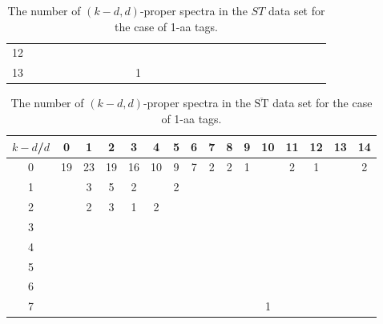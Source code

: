 \documentclass{article}[12pt]
\def\STbar{{\overline{\mathrm{ST}}}}
\begin{document}
\begin{landscape}
\begin{table}[h]
{\begin{tabular}{|c|c|
c|c|c|c|c|c|c|c|c|c|c|c|c|c|c|c|c|c|c|c|c|c|c|c|c|}
12  &  &  &  &  &  &  &  &  &  &  &  &  &  &  &  &  &  &  &  &  &  &  &  &  &  & \\

13  &  &  &  &  &  &  &  &  &  & 1 &  &  &  &  &  &  &  &  &  &  &  &  &  &  &  & \\

  \hline
\end{tabular}
\par}
\centering
\caption{The number of $(k-d,d)$-proper spectra in the $ST$ data set for the case of 1-aa tags.}
\vspace{3mm}
\label{table:kd-1-proper-ST}
\end{table}
\end{landscape}
\begin{landscape}

\begin{table}[h]\footnotesize
{\centering
\begin{tabular}{|c|c|
c|c|c|c|c|c|c|c|c|c|c|c|c|c|}
  \hline
  $k-d$/$d$ 
 & 0 & 1 & 2 & 3 & 4 & 5 & 6 & 7 & 8 & 9 & 10 & 11 & 12 & 13 & 14\\

  \hline
  \hline

0  & 19 & 23 & 19 & 16 & 10 & 9 & 7 & 2 & 2 & 1 &  & 2 & 1 &  & 2\\

1  &  & 3 & 5 & 2 &  & 2 &  &  &  &  &  &  &  &  & \\

2  &  & 2 & 3 & 1 & 2 &  &  &  &  &  &  &  &  &  & \\

3  &  &  &  &  &  &  &  &  &  &  &  &  &  &  & \\

4  &  &  &  &  &  &  &  &  &  &  &  &  &  &  & \\

5  &  &  &  &  &  &  &  &  &  &  &  &  &  &  & \\

6  &  &  &  &  &  &  &  &  &  &  &  &  &  &  & \\

7  &  &  &  &  &  &  &  &  &  &  & 1 &  &  &  & \\

  \hline
\end{tabular}
\par}
\centering
\caption{The number of $(k-d,d)$-proper spectra in the $\STbar$ data set for the case of 1-aa tags.}
\vspace{3mm}
\label{table:kd-1-proper-ST-bar}
\end{table}
\end{landscape}
\end{document}
